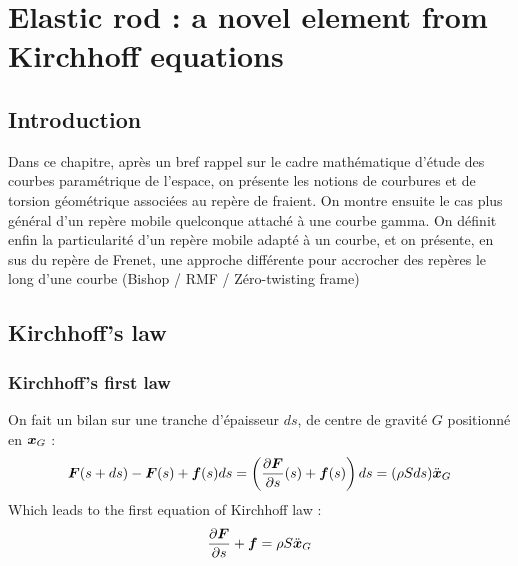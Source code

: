 \chapter{Elastic rod : a novel element from Kirchhoff equations}

\section{Introduction}
Dans ce chapitre, après un bref rappel sur le cadre mathématique d'étude des courbes paramétrique de l'espace, on présente les notions de courbures et de torsion géométrique associées au repère de fraient. On montre ensuite le cas plus général d'un repère mobile quelconque attaché à une courbe gamma. On définit enfin la particularité d'un repère mobile adapté à un courbe, et on présente, en sus du repère de Frenet, une approche différente pour accrocher des repères le long d'une courbe (Bishop / RMF / Zéro-twisting frame)

\cite{Dill1992}
\cite{Neukirch2009}
\cite{Adriaenssens1999}
\cite{Hoogenboom2006}
\cite{Lang2009}

\section{Kirchhoff's law}

\subsection{Kirchhoff's first law}
On fait un bilan sur une tranche d'épaisseur $ds$, de centre de gravité $G$ positionné en $\boldsymbol{x}_G$ :
\begin{equation}
	\boldsymbol{F}(s+ds)-\boldsymbol{F}(s) + \boldsymbol{f}(s)ds = \left(\frac{\partial \boldsymbol{F}}{\partial s}(s)+\boldsymbol{f}(s)\right)ds = (\rho Sds)\ddot{\boldsymbol{x}}_G
\end{equation}
Which leads to the first equation of Kirchhoff law :
\begin{equation}
	\frac{\partial \boldsymbol{F}}{\partial s}+\boldsymbol{f} = \rho S \ddot{\boldsymbol{x}}_G
\end{equation}

